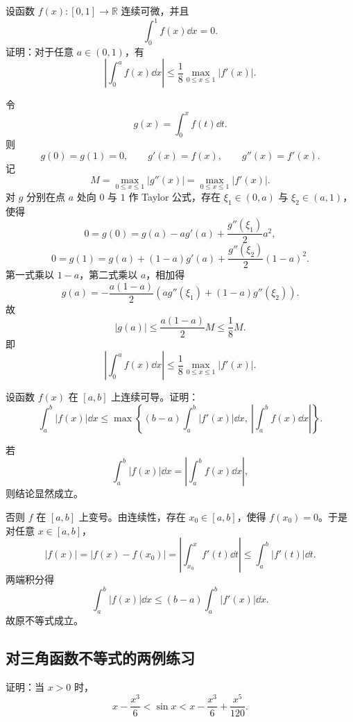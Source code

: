 \begin{problem}
	设函数 $f(x):[0,1]\to\mathbb{R}$ 连续可微，并且
	\[
	\int_0^1 f(x)\dd x=0.
	\]
	证明：对于任意 $a\in(0,1)$，有
	\[
	\left|\int_0^a f(x)\dd x\right|
	\leq
	\frac18\max_{0\leq x\leq1}|f'(x)|.
	\]
\end{problem}

\begin{solution}
	令
	\[
	g(x)=\int_0^x f(t)\dd t.
	\]
	则
	\[
	g(0)=g(1)=0,\qquad g'(x)=f(x),\qquad g''(x)=f'(x).
	\]
	记
	\[
	M=\max_{0\leq x\leq1}|g''(x)|=\max_{0\leq x\leq1}|f'(x)|.
	\]
	对 $g$ 分别在点 $a$ 处向 $0$ 与 $1$ 作 Taylor 公式，存在 $\xi_1\in(0,a)$ 与 $\xi_2\in(a,1)$，使得
	\[
	0=g(0)=g(a)-ag'(a)+\frac{g''(\xi_1)}2a^2,
	\]
	\[
	0=g(1)=g(a)+(1-a)g'(a)+\frac{g''(\xi_2)}2(1-a)^2.
	\]
	第一式乘以 $1-a$，第二式乘以 $a$，相加得
	\[
	g(a)=-\frac{a(1-a)}2\left(ag''(\xi_1)+(1-a)g''(\xi_2)\right).
	\]
	故
	\[
	|g(a)|\leq \frac{a(1-a)}2M\leq\frac18M.
	\]
	即
	\[
	\left|\int_0^a f(x)\dd x\right|
	\leq
	\frac18\max_{0\leq x\leq1}|f'(x)|.
	\]
\end{solution}

\begin{problem}
	设函数 $f(x)$ 在 $[a,b]$ 上连续可导。证明：
	\[
	\int_a^b |f(x)|\dd x
	\leq
	\max\left\{
	(b-a)\int_a^b |f'(x)|\dd x,\ 
	\left|\int_a^b f(x)\dd x\right|
	\right\}.
	\]
\end{problem}

\begin{solution}
	若
	\[
	\int_a^b |f(x)|\dd x=\left|\int_a^b f(x)\dd x\right|,
	\]
	则结论显然成立。
	
	否则 $f$ 在 $[a,b]$ 上变号。由连续性，存在 $x_0\in[a,b]$，使得 $f(x_0)=0$。于是对任意 $x\in[a,b]$，
	\[
	|f(x)|=|f(x)-f(x_0)|
	=\left|\int_{x_0}^x f'(t)\dd t\right|
	\leq
	\int_a^b |f'(t)|\dd t.
	\]
	两端积分得
	\[
	\int_a^b |f(x)|\dd x
	\leq
	(b-a)\int_a^b |f'(x)|\dd x.
	\]
	故原不等式成立。
\end{solution}

\subsection*{对三角函数不等式的两例练习}

\begin{problem}
	证明：当 $x>0$ 时，
	\[
	x-\frac{x^3}{6}<\sin x<x-\frac{x^3}{6}+\frac{x^5}{120}.
	\]
\end{problem}

